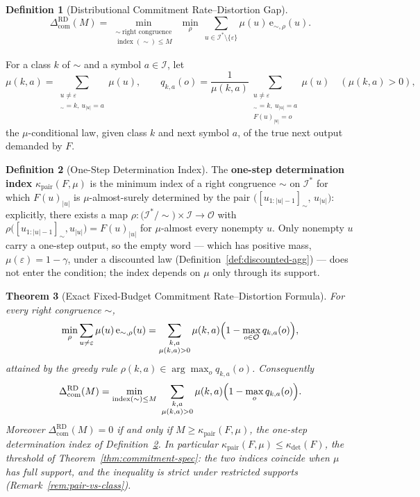 \documentclass[12pt]{article}
\newtheorem{theorem}{Theorem}[section]
\theoremstyle{definition}
\newtheorem{definition}[theorem]{Definition}
\newcommand{\ComRD}{\Delta_{\mathrm{com}}^{\mathrm{RD}}}
\begin{document}
\begin{definition}[Distributional Commitment Rate--Distortion Gap]
\label{def:com-rd-gap}
\[
\ComRD(M)
=
\min_{\substack{\sim\ \text{right congruence}\\ \operatorname{index}(\sim)\le M}}
\ \min_{\rho}
\ \sum_{u\in\mathcal I^*\setminus\{\varepsilon\}}
\mu(u)\,
\mathrm e_{\sim,\rho}(u).
\]
\end{definition}

For a class $k$ of $\sim$ and a symbol $a\in\mathcal I$, let
\[
\mu(k,a)
=
\sum_{\substack{u\ne\varepsilon\\ [u_{1:|u|-1}]_\sim=k,\ u_{|u|}=a}}
\mu(u),
\qquad
q_{k,a}(o)
=
\frac1{\mu(k,a)}
\sum_{\substack{u\ne\varepsilon\\ [u_{1:|u|-1}]_\sim=k,\ u_{|u|}=a\\ F(u)_{|u|}=o}}
\mu(u)
\quad(\mu(k,a)>0),
\]
the $\mu$-conditional law, given class $k$ and next symbol $a$, of the true
next output demanded by $F$.

\begin{definition}[One-Step Determination Index]
\label{def:pair-determination-index}
The \textbf{one-step determination index} $\kappa_{\mathrm{pair}}(F,\mu)$ is
the minimum index of a right congruence $\sim$ on $\mathcal I^*$ for which
$F(u)_{|u|}$ is $\mu$-almost-surely determined by the pair
$\bigl([u_{1:|u|-1}]_\sim,\,u_{|u|}\bigr)$: explicitly, there exists a map
$\rho:\bigl(\mathcal I^*/\!\sim\bigr)\times\mathcal I\to\mathcal O$ with
$\rho\bigl([u_{1:|u|-1}]_\sim,u_{|u|}\bigr)=F(u)_{|u|}$ for $\mu$-almost
every nonempty $u$.  Only nonempty $u$ carry a one-step output, so the empty
word --- which has positive mass, $\mu(\varepsilon)=1-\gamma$, under a
discounted law (Definition~\ref{def:discounted-agg}) --- does not enter the
condition; the index depends on $\mu$ only through its support.
\end{definition}

\begin{theorem}[Exact Fixed-Budget Commitment Rate--Distortion Formula]
\label{thm:com-rd-formula}
For every right congruence $\sim$,
\[
\min_\rho
\sum_{u\ne\varepsilon}
\mu(u)\,\mathrm e_{\sim,\rho}(u)
=
\sum_{\substack{k,a\\ \mu(k,a)>0}}
\mu(k,a)
\Bigl(1-\max_{o\in\mathcal O}q_{k,a}(o)\Bigr),
\]
attained by the greedy rule $\rho(k,a)\in\arg\max_oq_{k,a}(o)$.  Consequently
\[
\ComRD(M)
=
\min_{\operatorname{index}(\sim)\le M}
\ \sum_{\substack{k,a\\ \mu(k,a)>0}}
\mu(k,a)
\Bigl(1-\max_{o}q_{k,a}(o)\Bigr).
\]
Moreover $\ComRD(M)=0$ if and only if
$M\ge\kappa_{\mathrm{pair}}(F,\mu)$, the one-step determination index of
Definition~\ref{def:pair-determination-index}.  In particular
$\kappa_{\mathrm{pair}}(F,\mu)\le\kappa_{\det}(F)$, the threshold of
Theorem~\ref{thm:commitment-spec}: the two indices coincide when $\mu$ has
full support, and the inequality is strict under restricted supports
(Remark~\ref{rem:pair-vs-class}).
\end{theorem}
\end{document}
